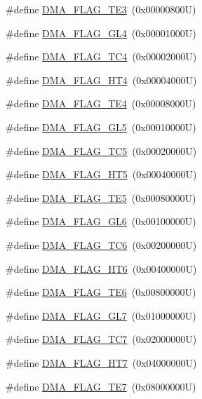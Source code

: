 \begin{DoxyCompactItemize}
\item 
\#define \hyperlink{group___d_m_a__flag__definitions_ga3e3d70e09d144c82ffc17d2ece186339}{D\+M\+A\+\_\+\+F\+L\+A\+G\+\_\+\+T\+E3}~(0x00000800\+U)
\item 
\#define \hyperlink{group___d_m_a__flag__definitions_ga4dc75a03066b5e3700cb650daf4731e2}{D\+M\+A\+\_\+\+F\+L\+A\+G\+\_\+\+G\+L4}~(0x00001000\+U)
\item 
\#define \hyperlink{group___d_m_a__flag__definitions_gafb3f8a8c7048d344865c47e72a598074}{D\+M\+A\+\_\+\+F\+L\+A\+G\+\_\+\+T\+C4}~(0x00002000\+U)
\item 
\#define \hyperlink{group___d_m_a__flag__definitions_ga1a766ffe9b0138d6ab42819c1a9206f1}{D\+M\+A\+\_\+\+F\+L\+A\+G\+\_\+\+H\+T4}~(0x00004000\+U)
\item 
\#define \hyperlink{group___d_m_a__flag__definitions_gab1bb20d71697de115b87319347216a26}{D\+M\+A\+\_\+\+F\+L\+A\+G\+\_\+\+T\+E4}~(0x00008000\+U)
\item 
\#define \hyperlink{group___d_m_a__flag__definitions_ga78246e9a0d30e63e4fe5a54207c41a3e}{D\+M\+A\+\_\+\+F\+L\+A\+G\+\_\+\+G\+L5}~(0x00010000\+U)
\item 
\#define \hyperlink{group___d_m_a__flag__definitions_ga2e3a81f03ed107dbb60cfa7560c32e97}{D\+M\+A\+\_\+\+F\+L\+A\+G\+\_\+\+T\+C5}~(0x00020000\+U)
\item 
\#define \hyperlink{group___d_m_a__flag__definitions_ga3f7bd37a3c6a833a5e8dd011f7ef9acd}{D\+M\+A\+\_\+\+F\+L\+A\+G\+\_\+\+H\+T5}~(0x00040000\+U)
\item 
\#define \hyperlink{group___d_m_a__flag__definitions_ga04a05f5cc8f193757d8658d97a857b3a}{D\+M\+A\+\_\+\+F\+L\+A\+G\+\_\+\+T\+E5}~(0x00080000\+U)
\item 
\#define \hyperlink{group___d_m_a__flag__definitions_ga2ea0eb984d33f6788a59f49dcd2acee0}{D\+M\+A\+\_\+\+F\+L\+A\+G\+\_\+\+G\+L6}~(0x00100000\+U)
\item 
\#define \hyperlink{group___d_m_a__flag__definitions_ga1e3da05635b4165ce2a0075646cc9131}{D\+M\+A\+\_\+\+F\+L\+A\+G\+\_\+\+T\+C6}~(0x00200000\+U)
\item 
\#define \hyperlink{group___d_m_a__flag__definitions_ga37e18ea9dab110bafc8de3b6aedabb02}{D\+M\+A\+\_\+\+F\+L\+A\+G\+\_\+\+H\+T6}~(0x00400000\+U)
\item 
\#define \hyperlink{group___d_m_a__flag__definitions_ga50e2f489b50cbe42d03a80ca7cd42dad}{D\+M\+A\+\_\+\+F\+L\+A\+G\+\_\+\+T\+E6}~(0x00800000\+U)
\item 
\#define \hyperlink{group___d_m_a__flag__definitions_gaf4619624c5d2cde7fc58bc4cd400bfc3}{D\+M\+A\+\_\+\+F\+L\+A\+G\+\_\+\+G\+L7}~(0x01000000\+U)
\item 
\#define \hyperlink{group___d_m_a__flag__definitions_gaacfd9fe9de9727dd862aa475b3d5aee8}{D\+M\+A\+\_\+\+F\+L\+A\+G\+\_\+\+T\+C7}~(0x02000000\+U)
\item 
\#define \hyperlink{group___d_m_a__flag__definitions_ga8216565e4c640761fa93891006d43655}{D\+M\+A\+\_\+\+F\+L\+A\+G\+\_\+\+H\+T7}~(0x04000000\+U)
\item 
\#define \hyperlink{group___d_m_a__flag__definitions_ga312e060067bffdf46136be4f7b0b614c}{D\+M\+A\+\_\+\+F\+L\+A\+G\+\_\+\+T\+E7}~(0x08000000\+U)
\end{DoxyCompactItemize}


